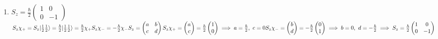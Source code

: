 \documentclass[12pt]{amsart}
\begin{document}
\begin{enumerate}
\item \underline{$S_z = \frac{\hbar}{2} \begin{pmatrix} 1 & 0 \\ 0 & -1 \end{pmatrix}$}\\
$S_z \chi_+ = S_z | \frac{1}{2} \frac{1}{2} \rangle = \frac{\hbar}{2} | \frac{1}{2} \frac{1}{2} \rangle = \frac{\hbar}{2} \chi_+\\
S_z \chi_- = - \frac{\hbar}{2} \chi_-\\
S_z = \begin{pmatrix} a & b \\ c & d \end{pmatrix}\\
S_z \chi_+ = \begin{pmatrix} a \\ c \end{pmatrix} = \frac{\hbar}{2} \begin{pmatrix} 1 \\ 0 \end{pmatrix} \implies a = \frac{\hbar}{2},\,\, c = 0\\
S_z \chi_- = \begin{pmatrix} b \\ d \end{pmatrix} = - \frac{\hbar}{2} \begin{pmatrix} 0 \\ 1 \end{pmatrix} \implies b = 0,\,\, d = - \frac{\hbar}{2}\\
\implies S_z = \frac{\hbar}{2} \begin{pmatrix} 1 & 0 \\ 0 & -1 \end{pmatrix}\\
$

\hdashrule[0.5ex][c]{\linewidth}{0.5pt}{1.5mm}



\end{enumerate}
\end{document}
